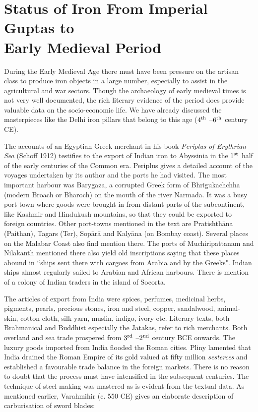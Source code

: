 \vspace{-.4cm}

\section*{Status of Iron From Imperial Guptas to\\ Early Medieval Period}\label{chapter5-section-1}

\vspace{-.2cm}

During the Early Medieval Age there must have been pressure on the artisan class to produce iron objects in a large number, especially to assist in the agricultural and war sectors. Though the archaeology of early medieval times is not very well documented, the rich literary evidence of the period does provide valuable data on the socio-economic life. We have already discussed the masterpieces like the Delhi iron pillars that belong to this age ($4^{\rm th}$ –$6^{\rm th}$  century CE).

The accounts of an Egyptian-Greek merchant in his book {\it Periplus of Erythrian Sea} (Schoff 1912) testifies to the export of Indian iron to Abyssinia in the $1^{\rm st}$ half of the early centuries of the Common era. Periplus gives a detailed account of the voyages undertaken by its author and the ports he had visited. The most important harbour was Barygaza, a corrupted Greek form of Bhrigukachchha (modern Broach or Bharoch) on the mouth of the river Narmada. It was a busy port town where goods were brought in from distant parts of the subcontinent, like Kashmir and Hindukush mountains, so that they could be exported to foreign countries. Other port-towns mentioned in the text are Pratishthāna (Paithan), Tagars (Ter), Sopārā and Kalyāna (on Bombay coast). Several places on the Malabar Coast also find mention there. The ports of Muchiripattanam and Nilakanth mentioned there also yield old inscriptions saying that these places abound in ``ships sent there with cargoes from Arabia and by the Greeks". Indian ships almost regularly sailed to Arabian and African harbours. There is mention of a colony of Indian traders in the island of Socorta.

The articles of export from India were spices, perfumes, medicinal herbs, pigments, pearls, precious stones, iron and steel, copper, sandalwood, animal-skin, cotton cloth, silk yarn, muslin, indigo, ivory etc. Literary texts, both Brahmanical and Buddhist especially the Jatakas, refer to rich merchants. Both overland and sea trade prospered from $3^{\rm rd}$ –$2^{\rm nd}$ century BCE onwards. The luxury goods imported from India flooded the Roman cities. Pliny lamented that India drained the Roman Empire of its gold valued at fifty million {\it sesterces} and established a favourable trade balance in the foreign markets. There is no reason to doubt that the process must have intensified in the subsequent centuries. The technique of steel making was mastered as is evident from the textual data. As mentioned earlier, Varahmihir (c. 550 CE) gives an elaborate description of carburisation of sword blades: 

